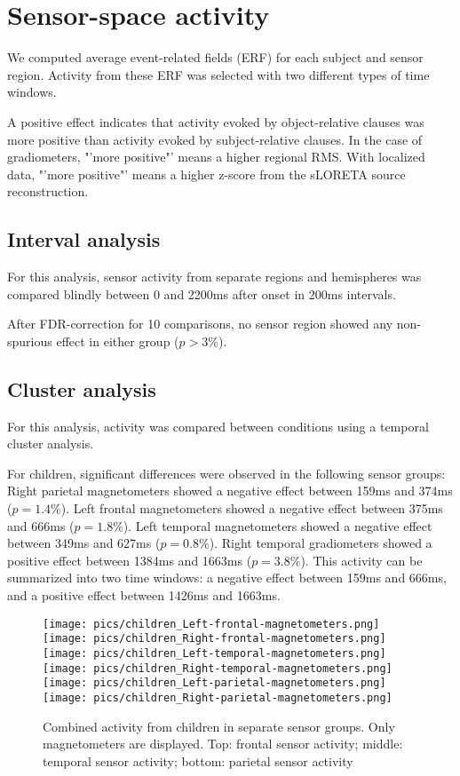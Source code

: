 \section{Sensor-space activity}

We computed average event-related fields (ERF) for each subject and sensor region.
Activity from these ERF was selected with two different types of time windows.

A positive effect indicates that activity evoked by object-relative clauses was more positive than activity evoked by subject-relative clauses. In the case of gradiometers, "'more positive"' means a higher regional RMS. With localized data, "'more positive"' means a higher z-score from the sLORETA source reconstruction.


\subsection{Interval analysis}
For this analysis, sensor activity from separate regions and hemispheres was compared blindly between 0 and 2200ms after onset in 200ms intervals.

After FDR-correction for 10 comparisons, no sensor region showed any non-spurious effect in either group ($p > 3\%$).

\subsection{Cluster analysis}
For this analysis, activity was compared between conditions using a temporal cluster analysis.

For children, significant differences were observed in the following sensor groups:
Right parietal magnetometers showed a negative effect between 159ms and 374ms ($p = 1.4\%$).
Left frontal magnetometers showed a negative effect between 375ms and 666ms ($p = 1.8\%$).
Left temporal magnetometers showed a negative effect between 349ms and 627ms ($p = 0.8\%$).
Right temporal gradiometers showed a positive effect between 1384ms and 1663ms ($p = 3.8\%$).
This activity can be summarized into two time windows: a negative effect between 159ms and 666ms, and a positive effect between 1426ms and 1663ms.

\begin{figure}[h]
\begin{center}
\vspace{7mm}
\texttt{[image: pics/children\_Left-frontal-magnetometers.png]}
\texttt{[image: pics/children\_Right-frontal-magnetometers.png]}
\texttt{[image: pics/children\_Left-temporal-magnetometers.png]}
\texttt{[image: pics/children\_Right-temporal-magnetometers.png]}
\texttt{[image: pics/children\_Left-parietal-magnetometers.png]}
\texttt{[image: pics/children\_Right-parietal-magnetometers.png]}
\caption{\label{4.2.activity.kids} Combined activity from children in separate sensor groups. Only magnetometers are displayed. Top: frontal sensor activity; middle: temporal sensor activity; bottom: parietal sensor activity}
\end{center}
\end{figure}


